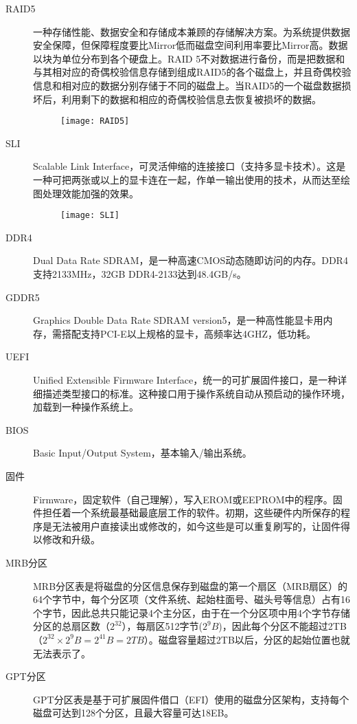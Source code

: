 \begin{description}
\item[RAID5] 一种存储性能、数据安全和存储成本兼顾的存储解决方案。为系统提供数据安全保障，但保障程度要比Mirror低而磁盘空间利用率要比Mirror高。数据以块为单位分布到各个硬盘上。RAID 5不对数据进行备份，而是把数据和与其相对应的奇偶校验信息存储到组成RAID5的各个磁盘上，并且奇偶校验信息和相对应的数据分别存储于不同的磁盘上。当RAID5的一个磁盘数据损坏后，利用剩下的数据和相应的奇偶校验信息去恢复被损坏的数据。
\begin{figure}[!ht]
\centering
\texttt{[image: RAID5]}
\end{figure}

\item[SLI] Scalable Link Interface，可灵活伸缩的连接接口（支持多显卡技术）。这是一种可把两张或以上的显卡连在一起，作单一输出使用的技术，从而达至绘图处理效能加强的效果。
\begin{figure}[!ht]
\centering
\texttt{[image: SLI]}
\end{figure}

\item[DDR4] Dual Data Rate SDRAM，是一种高速CMOS动态随即访问的内存。DDR4支持2133MHz，32GB DDR4-2133达到48.4GB/s。

\item[GDDR5] Graphics Double Data Rate SDRAM version5，是一种高性能显卡用内存，需搭配支持PCI-E以上规格的显卡，高频率达4GHZ，低功耗。

\item[UEFI] Unified Extensible Firmware Interface，统一的可扩展固件接口，是一种详细描述类型接口的标准。这种接口用于操作系统自动从预启动的操作环境，加载到一种操作系统上。
\item[BIOS] Basic Input/Output System，基本输入/输出系统。
\item[固件] Firmware，固定软件（自己理解），写入EROM或EEPROM中的程序。固件担任着一个系统最基础最底层工作的软件。初期，这些硬件内所保存的程序是无法被用户直接读出或修改的，如今这些是可以重复刷写的，让固件得以修改和升级。
\item[MRB分区] MRB分区表是将磁盘的分区信息保存到磁盘的第一个扇区（MRB扇区）的64个字节中，每个分区项（文件系统、起始柱面号、磁头号等信息）占有16个字节，因此总共只能记录4个主分区，由于在一个分区项中用4个字节存储分区的总扇区数（$2^{32}$），每扇区512字节($2^{9}B$)，因此每个分区不能超过2TB（$2^{32} \times 2^{9}B=2^{41}B=2TB$）。磁盘容量超过2TB以后，分区的起始位置也就无法表示了。
\item[GPT分区] GPT分区表是基于可扩展固件借口（EFI）使用的磁盘分区架构，支持每个磁盘可达到128个分区，且最大容量可达18EB。
\end{description}



